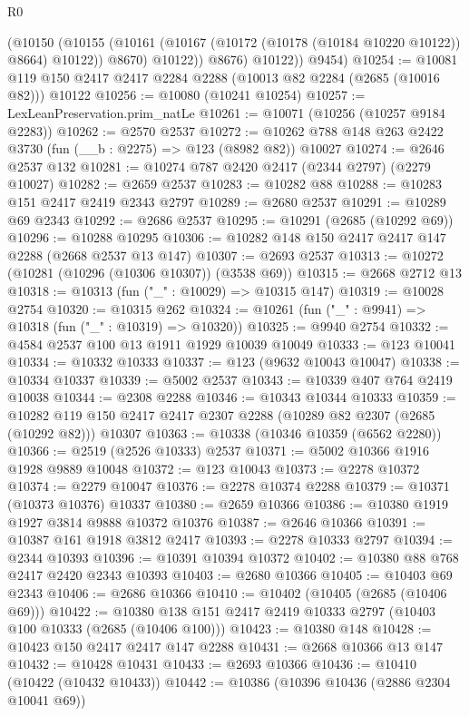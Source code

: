 \begin{lexlean}{R0}
\begin{coremodule}
              (@10150
                (@10155
                  (@10161 (@10167 (@10172 (@10178 (@10184 @10220 @10122)) @8664) @10122))
                  @8670)
                @10122))
            @8676)
          @10122))
      @9454)
@10254 := @10081 @119 @150 @2417 @2417 @2284 @2288 (@10013 @82 @2284 (@2685 (@10016 @82))) @10122
@10256 := @10080 (@10241 @10254)
@10257 := LexLeanPreservation.prim_natLe
@10261 := @10071 (@10256 (@10257 @9184 @2283))
@10262 := @2570 @2537
@10272 := @10262 @788 @148 @263 @2422 @3730 (fun (__b : @2275) => @123 (@8982 @82)) @10027
@10274 := @2646 @2537 @132
@10281 := @10274 @787 @2420 @2417 (@2344 @2797) (@2279 @10027)
@10282 := @2659 @2537
@10283 := @10282 @88
@10288 := @10283 @151 @2417 @2419 @2343 @2797
@10289 := @2680 @2537
@10291 := @10289 @69 @2343
@10292 := @2686 @2537
@10295 := @10291 (@2685 (@10292 @69))
@10296 := @10288 @10295
@10306 := @10282 @148 @150 @2417 @2417 @147 @2288 (@2668 @2537 @13 @147)
@10307 := @2693 @2537
@10313 := @10272 (@10281 (@10296 (@10306 @10307)) (@3538 @69))
@10315 := @2668 @2712 @13
@10318 := @10313 (fun ("_" : @10029) => @10315 @147)
@10319 := @10028 @2754
@10320 := @10315 @262
@10324 := @10261 (fun ("_" : @9941) => @10318 (fun ("_" : @10319) => @10320))
@10325 := @9940 @2754
@10332 := @4584 @2537 @100 @13 @1911 @1929 @10039 @10049
@10333 := @123 @10041
@10334 := @10332 @10333
@10337 := @123 (@9632 @10043 @10047)
@10338 := @10334 @10337
@10339 := @5002 @2537
@10343 := @10339 @407 @764 @2419 @10038
@10344 := @2308 @2288
@10346 := @10343 @10344 @10333
@10359 := @10282 @119 @150 @2417 @2417 @2307 @2288 (@10289 @82 @2307 (@2685 (@10292 @82))) @10307
@10363 := @10338 (@10346 @10359 (@6562 @2280))
@10366 := @2519 (@2526 @10333) @2537
@10371 := @5002 @10366 @1916 @1928 @9889 @10048
@10372 := @123 @10043
@10373 := @2278 @10372
@10374 := @2279 @10047
@10376 := @2278 @10374 @2288
@10379 := @10371 (@10373 @10376) @10337
@10380 := @2659 @10366
@10386 := @10380 @1919 @1927 @3814 @9888 @10372 @10376
@10387 := @2646 @10366
@10391 := @10387 @161 @1918 @3812 @2417
@10393 := @2278 @10333 @2797
@10394 := @2344 @10393
@10396 := @10391 @10394 @10372
@10402 := @10380 @88 @768 @2417 @2420 @2343 @10393
@10403 := @2680 @10366
@10405 := @10403 @69 @2343
@10406 := @2686 @10366
@10410 := @10402 (@10405 (@2685 (@10406 @69)))
@10422 := @10380 @138 @151 @2417 @2419 @10333 @2797 (@10403 @100 @10333 (@2685 (@10406 @100)))
@10423 := @10380 @148
@10428 := @10423 @150 @2417 @2417 @147 @2288
@10431 := @2668 @10366 @13 @147
@10432 := @10428 @10431
@10433 := @2693 @10366
@10436 := @10410 (@10422 (@10432 @10433))
@10442 := @10386 (@10396 @10436 (@2886 @2304 @10041 @69))

\end{coremodule}
\end{lexlean}
